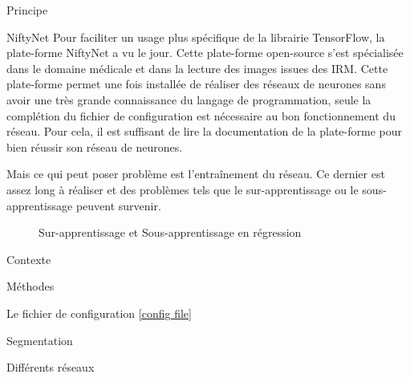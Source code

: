 \documentclass{book}
\newcommand{\p}{\vspace{0.2cm}}
\begin{document}
\begin{chapter}{Principe}
\begin{section}{NiftyNet}
			Pour faciliter un usage plus spécifique de la librairie TensorFlow, la plate-forme NiftyNet a vu le jour. Cette plate-forme open-source s'est spécialisée dans le domaine médicale et dans la lecture des images issues des IRM. Cette plate-forme permet une fois installée de réaliser des réseaux de neurones sans avoir une très grande connaissance du langage de programmation, seule la complétion du fichier de configuration est nécessaire au bon fonctionnement du réseau. Pour cela, il est suffisant de lire la documentation de la plate-forme pour bien réussir son réseau de neurones.\p

			Mais ce qui peut poser problème est l'entraînement du réseau. Ce dernier est assez long à réaliser et des problèmes tels que le sur-apprentissage ou le sous-apprentissage peuvent survenir.
			\begin{figure}
				\begin{center}
					\caption{Sur-apprentissage et Sous-apprentissage en régression}
					\label{over and under}
				\end{center}
			\end{figure}

		\end{section}

	\end{chapter}

	\begin{chapter}{Contexte}

	\end{chapter}

	\begin{chapter}{Méthodes}

		\begin{section}{Le fichier de configuration}
			\ref{config file}
		\end{section}

		\begin{section}{Segmentation}

		\end{section}

		\begin{section}{Différents réseaux}

		\end{section}

	\end{chapter}
\end{document}
